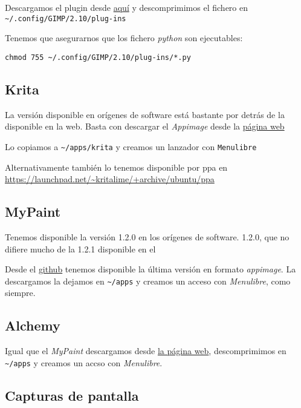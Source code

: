 \documentclass[
  12pt,
  spanish,
]{article}
\begin{document}
Descargamos el plugin desde
\href{https://github.com/bootchk/resynthesizer}{aquí} y descomprimimos
el fichero en \texttt{\textasciitilde{}/.config/GIMP/2.10/plug-ins}

Tenemos que asegurarnos que los fichero \emph{python} son ejecutables:

\begin{verbatim}
chmod 755 ~/.config/GIMP/2.10/plug-ins/*.py
\end{verbatim}

\hypertarget{krita}{%
\subsection{Krita}\label{krita}}

La versión disponible en orígenes de software está bastante por detrás
de la disponible en la web. Basta con descargar el \emph{Appimage} desde
la \href{https://krita.org}{página web}

Lo copiamos a \texttt{\textasciitilde{}/apps/krita} y creamos un
lanzador con \texttt{Menulibre}

Alternativamente también lo tenemos disponible por ppa en
\url{https://launchpad.net/~kritalime/+archive/ubuntu/ppa}

\hypertarget{mypaint}{%
\subsection{MyPaint}\label{mypaint}}

Tenemos disponible la versión 1.2.0 en los orígenes de software. 1.2.0,
que no difiere mucho de la 1.2.1 disponible en el

Desde el \href{https://github.com/mypaint/}{github} tenemos disponible
la última versión en formato \emph{appimage}. La descargamos la dejamos
en \texttt{\textasciitilde{}/apps} y creamos un acceso con
\emph{Menulibre}, como siempre.

\hypertarget{alchemy}{%
\subsection{Alchemy}\label{alchemy}}

Igual que el \emph{MyPaint} descargamos desde
\href{http://al.chemy.org}{la página web}, descomprimimos en
\texttt{\textasciitilde{}/apps} y creamos un accso con \emph{Menulibre}.

\hypertarget{capturas-de-pantalla}{%
\subsection{Capturas de pantalla}\label{capturas-de-pantalla}}
\end{document}
